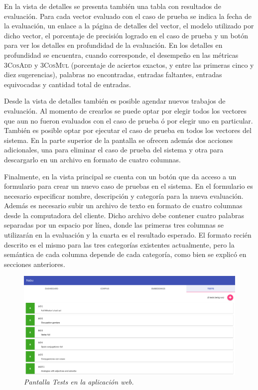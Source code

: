 En la vista de detalles se presenta también una tabla con resultados de evaluación. Para cada vector
evaluado con el caso de prueba se indica la fecha de la evaluación, un enlace a la página de detalles del
vector, el modelo utilizado por dicho vector, el porcentaje de precisión logrado en el caso de prueba y
un botón para ver los detalles en profundidad de la evaluación. En los detalles en profundidad se
encuentra, cuando corresponde, el desempeño en las métricas \textsc{3CosAdd} y \textsc{3CosMul}
(porcentaje de aciertos exactos, y entre las primeras cinco y diez sugerencias), palabras no encontradas,
entradas faltantes, entradas equivocadas y cantidad total de entradas.

Desde la vista de detalles también es posible agendar nuevos trabajos de evaluación. Al momento de
crearlos se puede optar por elegir todos los vectores que aun no fueron evaluados con el caso de prueba
ó por elegir uno en particular. También es posible optar por ejecutar el caso de prueba en todos los
vectores del sistema. En la parte superior de la pantalla se ofrecen además dos acciones adicionales,
una para eliminar el caso de prueba del sistema y otra para descargarlo en un archivo en formato de
cuatro columnas.

Finalmente, en la vista principal se cuenta con un botón que da acceso a un formulario para crear un
nuevo caso de pruebas en el sistema. En el formulario es necesario especificar nombre, descripción y
categoría para la nueva evaluación. Además es necesario subir un archivo de texto en formato de cuatro
columnas desde la computadora del cliente. Dicho archivo debe contener cuatro palabras separadas por un
espacio por línea, donde las primeras tres columnas se utilizarán en la evaluación y la cuarta es el
resultado esperado. El formato recién descrito es el mismo para las tres categorías existentes
actualmente, pero la semántica de cada columna depende de cada categoría, como bien se explicó en
secciones anteriores.

\begin{figure}[h]
    \centering
    \includegraphics[width=\textwidth]{images/ui-nabu-tests}
    \caption{\textit{Pantalla Tests en la aplicación web.}}
    \label{fig:ui-nabu-tests}
\end{figure}


